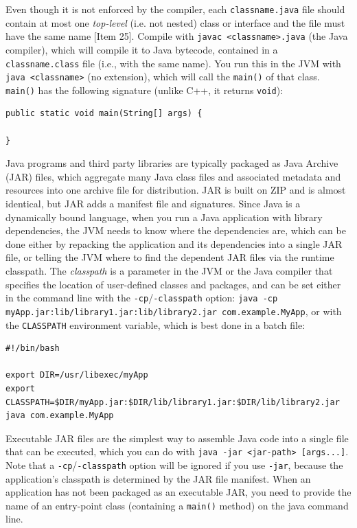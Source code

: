 \documentclass[table, xcdraw]{article}%
\begin{document}
Even though it is not enforced by the compiler, each \texttt{classname.java} file should contain at most one \emph{top-level} (i.e. not nested) class or interface and the file must have the same name [Item 25]. Compile with \texttt{javac <classname>.java} (the Java compiler), which will compile it to Java bytecode, contained in a \texttt{classname.class} file (i.e., with the same name). You run this in the JVM with \texttt{java <classname>} (no extension), which will call the \texttt{main()} of that class. \texttt{main()} has the following signature (unlike C++, it returns \texttt{void}):

\begin{verbatim}
public static void main(String[] args) {

}
\end{verbatim}

Java programs and third party libraries are typically packaged as Java Archive (JAR) files, which aggregate many Java class files and associated metadata and resources into one archive file for distribution. JAR is built on ZIP and is almost identical, but JAR adds a manifest file and signatures. Since Java is a dynamically bound language, when you run a Java application with library dependencies, the JVM needs to know where the dependencies are, which can be done either by repacking the application and its dependencies into a single JAR file, or telling the JVM where to find the dependent JAR files via the runtime classpath. The \textit{classpath} is a parameter in the JVM or the Java compiler that specifies the location of user-defined classes and packages, and can be set either in the command line with the \texttt{-cp}/\texttt{-classpath} option: \texttt{java -cp myApp.jar:lib/library1.jar:lib/library2.jar com.example.MyApp}, or with the \texttt{CLASSPATH} environment variable, which is best done in a batch file:

\begin{verbatim}
#!/bin/bash

export DIR=/usr/libexec/myApp
export CLASSPATH=$DIR/myApp.jar:$DIR/lib/library1.jar:$DIR/lib/library2.jar
java com.example.MyApp
\end{verbatim}

Executable JAR files are the simplest way to assemble Java code into a single file that can be executed, which you can do with \texttt{java -jar <jar-path> [args...]}. Note that a \texttt{-cp}/\texttt{-classpath} option will be ignored if you use \texttt{-jar}, because the application's classpath is determined by the JAR file manifest. When an application has not been packaged as an executable JAR, you need to provide the name of an entry-point class (containing a \texttt{main()} method) on the java command line.
\end{document}
